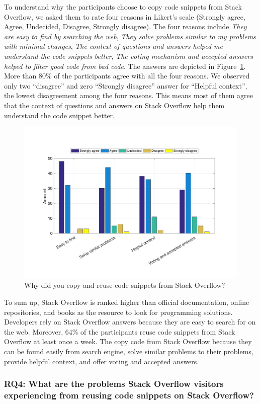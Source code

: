 \documentclass{svjour3}                     %
\begin{document}
To understand why the participants choose to copy code snippets from Stack
Overflow, we asked them to rate four reasons in Likert's scale (Strongly agree,
Agree, Undecided, Disagree, Strongly disagree). The four reasons include
\textit{They are easy to find by searching the web}, \textit{They solve problems
	similar to my problems with minimal changes}, \textit{The context of questions
	and answers helped me understand the code snippets better}, \textit{The voting
	mechanism and accepted answers helped to filter good code from bad code}. The
answers are depicted in Figure~\ref{fig:survey_visitor_why_copy_so}. More than
80\% of the participants agree with all the four reasons. We observed only two
``disagree'' and zero ``Strongly disagree'' answer for ``Helpful context'', the
lowest disagreement among the four reasons. This means most of them agree that
the context of questions and answers on Stack Overflow help them understand the
code snippet better.

\begin{figure} \centering
	\includegraphics[width=0.6\linewidth]{survey_visitor_why_copy_so} 
	\caption{Why did you copy and reuse code snippets from Stack Overflow?}
	\label{fig:survey_visitor_why_copy_so} 
\end{figure}

To sum up, Stack Overflow is ranked higher than official documentation, online
repositories, and books as the resource to look for programming solutions.
Developers rely on Stack Overflow answers because they are easy to search for on
the web. Moreover, 64\% of the participants reuse code snippets from Stack
Overflow at least once a week. The copy code from Stack Overflow because they
can be found easily from search engine, solve similar problems to their
problems, provide helpful context, and offer voting and accepted answers.

\subsubsection*{RQ4: What are the problems Stack Overflow visitors experiencing
	from reusing code snippets on Stack Overflow?}
\end{document}
